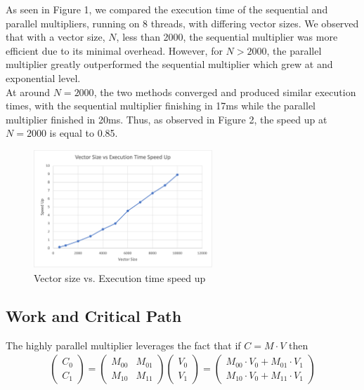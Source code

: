 \documentclass{article}%
\begin{document}
        As seen in Figure 1, we compared the execution time of the sequential and parallel multipliers, running on 8 threads, with differing vector sizes. We observed that with a vector size, $N$, less than 2000, the sequential multiplier was more efficient due to its minimal overhead. However, for $N > 2000$, the parallel multiplier greatly outperformed the sequential multiplier which grew at and exponential level. \\
        
        At around $N = 2000$, the two methods converged and produced similar execution times, with the sequential multiplier finishing in 17ms while the parallel multiplier finished in 20ms. Thus, as observed in Figure 2, the speed up at $N = 2000$ is equal to 0.85. 
        
        \begin{figure}[H]
            \centering
            \includegraphics[width=0.6\textwidth]{images/speed-up.png}
            \caption{Vector size vs. Execution time speed up}
        \end{figure}
        \FloatBarrier

    \subsection{Work and Critical Path}
        The highly parallel multiplier leverages the fact that if $C = M \cdot V$ then 
        \begin{gather}
            \begin{pmatrix} C_0 \\ C_1 \end{pmatrix}
            =
            \begin{pmatrix} M_{00} & M_{01} \\ M_{10} & M_{11} \end{pmatrix}
            \begin{pmatrix} V_0 \\ V_1 \end{pmatrix}
            = 
            \begin{pmatrix} M_{00} \cdot V_0 + M_{01} \cdot V_1 \\ M_{10} \cdot V_0 + M_{11} \cdot V_1  \end{pmatrix}
        \end{gather}
        
\end{document}
